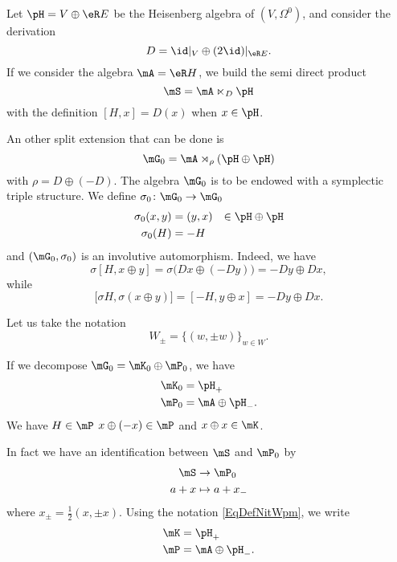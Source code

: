 Let $\pH=V\oplus\eR E$  be the Heisenberg algebra of $(V,\Omega^0)$, and consider the derivation
\begin{equation}
	D=\id|_V\oplus(2\id)|_{\eR E}.
\end{equation}
If we consider the algebra $\mA=\eR H$, we build the semi direct product
\begin{equation}
	\mS=\mA\ltimes_D\pH
\end{equation}
with the definition $[H,x]=D(x)$ when $x\in\pH$.

An other split extension that can be done is
\begin{equation}
	\mG_0=\mA\rtimes_{\rho}(\pH\oplus\pH)
\end{equation}
with $\rho=D\oplus(-D)$. The algebra $\mG_0$ is to be endowed with a symplectic triple structure. We define $\sigma_0\colon \mG_0\to \mG_0$
\begin{equation}
	\begin{aligned}[]
		\sigma_0(x,y) & =(y,x) & \in\pH\oplus\pH \\
		\sigma_0(H)   & =-H
	\end{aligned}
\end{equation}
and $(\mG_0,\sigma_0)$ is an involutive automorphism. Indeed, we have
\begin{equation}
	\sigma[H,x\oplus y]=\sigma\big( Dx\oplus(-Dy) \big)=-Dy\oplus Dx,
\end{equation}
while
\begin{equation}
	\big[ \sigma H,\sigma(x\oplus y) \big]=[-H,y\oplus x]=-Dy\oplus Dx.
\end{equation}

Let us take the notation
\begin{equation}		\label{EqDefNitWpm}
	W_{\pm}=\{ (w,\pm w) \}_{w\in W}.
\end{equation}

If we decompose $\mG_0=\mK_0\oplus\mP_0$, we have
\begin{equation}
	\begin{aligned}[]
		\mK_0 & =\pH_+           \\
		\mP_0 & =\mA\oplus\pH_-.
	\end{aligned}
\end{equation}
We have $H\in\mP$ $x\oplus(-x)\in\mP$ and $x\oplus x\in\mK$.

In fact we have an identification between $\mS$ and $\mP_0$ by
\begin{equation}
	\begin{aligned}
		\mS & \to \mP_0     \\
		a+x & \mapsto a+x_-
	\end{aligned}
\end{equation}
where $x_{\pm}=\frac{ 1 }{2}(x,\pm x)$. Using the notation \eqref{EqDefNitWpm}, we write
\begin{equation}
	\begin{aligned}[]
		\mK & =\pH_{+}           \\
		\mP & =\mA\oplus\pH_{-}.
	\end{aligned}
\end{equation}

